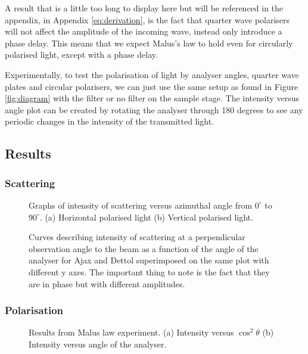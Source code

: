 \documentclass{article}
\begin{document}
A result that is a little too long to display here but will be referenced in 
the appendix, in Appendix \ref{eq:derivation}, is the fact that quarter wave 
polarisers will not affect the amplitude of the incoming wave, instead only 
introduce a phase delay. This means that we expect Malus's law to hold even 
for circularly polarised light, except with a phase delay.

Experimentally, to test the polarisation of light by analyser angles, quarter
wave plates and circular polarisers, we can just use the same setup as found in 
Figure \ref{fig:diagram} with the filter or no filter on the sample stage. 
The intensity versus angle plot can be created by rotating the analyser through 
180 degrees to see any periodic changes in the intensity of the transmitted 
light.

\subsection{Results}

\subsubsection{Scattering}
\begin{figure} [H]
    \centering
    \scalebox{0.5}{}
    \hspace{0.5cm}
    \scalebox{0.5}{}
    \caption{Graphs of intensity of scattering versus azimuthal angle
    from $0^\circ$ to $90^\circ$. (a) Horizontal polarised light 
    (b) Vertical polarised light.}
    \label{plot:dettol}
\end{figure}


\begin{figure} [H]
    \centering
    \scalebox{0.75}{}
    \caption{Curves describing intensity of scattering at a 
    perpendicular observation angle to the beam as a function of 
    the angle of the analyser for Ajax and Dettol superimposed on the 
    same plot with different y axes. The important thing to note is the
    fact that they are in phase but with different amplitudes.}
    \label{plot:ajaxdettol}
\end{figure}

\subsubsection{Polarisation}

\begin{figure} [H]
    \centering
    \scalebox{0.5}{}
    \hspace{0.5cm}
    \scalebox{0.5}{}
    \caption{Results from Malus law experiment. (a) Intensity versus 
    $\cos^2{\theta}$ (b) Intensity versus angle of the analyser.}
    \label{plot:malus}
\end{figure}
\end{document}
